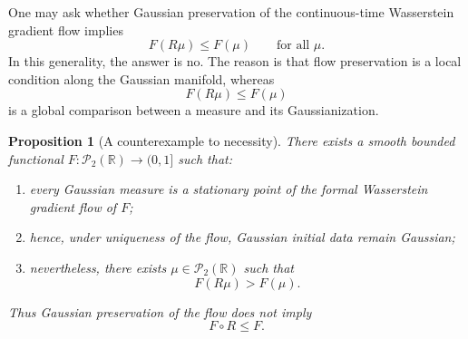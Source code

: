 \documentclass[11pt]{article}
\newtheorem{proposition}{Proposition}
\newcommand{\R}{\mathbb R}
\begin{document}
One may ask whether Gaussian preservation of the continuous-time Wasserstein
gradient flow implies
\[
F(R\mu)\le F(\mu)
\qquad
\text{for all }\mu.
\]
In this generality, the answer is no. The reason is that flow preservation is a
local condition along the Gaussian manifold, whereas
\[
F(R\mu)\le F(\mu)
\]
is a global comparison between a measure and its Gaussianization.

\begin{proposition}[A counterexample to necessity]
There exists a smooth bounded functional $F:\mathcal P_2(\R)\to(0,1]$ such
that:

\begin{enumerate}
\item every Gaussian measure is a stationary point of the formal Wasserstein
gradient flow of $F$;

\item hence, under uniqueness of the flow, Gaussian initial data remain
Gaussian;

\item nevertheless, there exists $\mu\in\mathcal P_2(\R)$ such that
\[
F(R\mu)>F(\mu).
\]
\end{enumerate}
Thus Gaussian preservation of the flow does not imply
\[
F\circ R\le F.
\]
\end{proposition}
\end{document}
